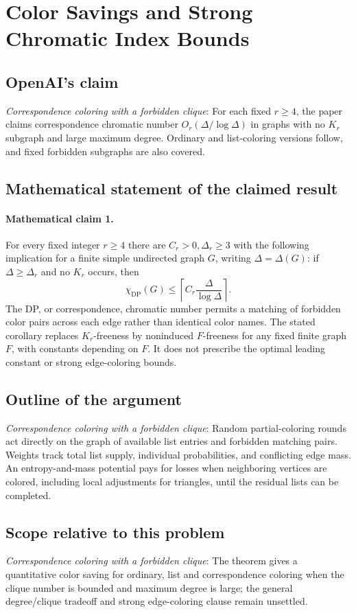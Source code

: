 \documentclass[11pt]{article}
\begin{document}
\section*{Color Savings and Strong Chromatic Index Bounds}

\subsection{OpenAI's claim}
\textit{Correspondence coloring with a forbidden clique}: For each fixed $r\ge4$, the paper claims correspondence chromatic number $O_r(\Delta/\log\Delta)$ in graphs with no $K_r$ subgraph and large maximum degree. Ordinary and list-coloring versions follow, and fixed forbidden subgraphs are also covered.

\subsection{Mathematical statement of the claimed result}
\paragraph{Mathematical claim 1.} For every fixed integer $r\ge4$ there are $C_r>0,\Delta_r\ge3$ with the following implication for a finite simple undirected graph $G$, writing $\Delta=\Delta(G)$: if $\Delta\ge\Delta_r$ and no $K_r$ occurs, then \[\chi_{\mathrm{DP}}(G)\le\left\lceil C_r\frac\Delta{\log\Delta}\right\rceil.\] The DP, or correspondence, chromatic number permits a matching of forbidden color pairs across each edge rather than identical color names. The stated corollary replaces $K_r$-freeness by noninduced $F$-freeness for any fixed finite graph $F$, with constants depending on $F$. It does not prescribe the optimal leading constant or strong edge-coloring bounds.

\subsection{Outline of the argument}
\textit{Correspondence coloring with a forbidden clique}: Random partial-coloring rounds act directly on the graph of available list entries and forbidden matching pairs. Weights track total list supply, individual probabilities, and conflicting edge mass. An entropy-and-mass potential pays for losses when neighboring vertices are colored, including local adjustments for triangles, until the residual lists can be completed.

\subsection{Scope relative to this problem}
\textit{Correspondence coloring with a forbidden clique}: The theorem gives a quantitative color saving for ordinary, list and correspondence coloring when the clique number is bounded and maximum degree is large; the general degree/clique tradeoff and strong edge-coloring clause remain unsettled.
\end{document}
